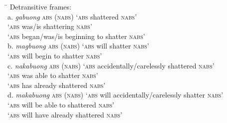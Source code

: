 \begin{tabbing}
\hspace{4.5cm} \= \kill
Detransitive frames: \\
a.  \textit{gabuong} \textsc{abs} (\textsc{nabs}) \> ‘\textsc{abs} shattered \textsc{nabs}’ \\
\>       ‘\textsc{abs} was/is shattering \textsc{nabs}’ \\
\>       ‘\textsc{abs} began/was/is beginning to shatter \textsc{nabs}’ \\
b.  \textit{magbuong} \textsc{abs} (\textsc{nabs}) \> ‘\textsc{abs} will shatter \textsc{nabs}’ \\
\>       ‘\textsc{abs} will begin to shatter \textsc{nabs}’ \\
c.  \textit{nakabuong} \textsc{abs} (\textsc{nabs}) \> ‘\textsc{abs} accidentally/carelessly shattered \textsc{nabs}’ \\
\>       ‘\textsc{abs} was able to shatter \textsc{nabs}’ \\
\>      ‘\textsc{abs} has already shattered \textsc{nabs}’ \\
d.  \textit{makabuong} \textsc{abs} (\textsc{nabs}) \> ‘\textsc{abs} will accidentally/carelessly shatter \textsc{nabs}’ \\
\>      ‘\textsc{abs} will be able to shattered \textsc{nabs}’ \\
\>      ‘\textsc{abs} will have already shattered \textsc{nabs}’
\end{tabbing}
\z

